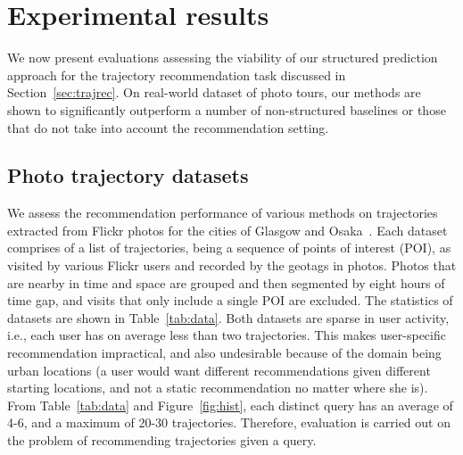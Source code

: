 
\secmoveup
\section{Experimental results}
\label{sec:experiment}
\textmoveup

We now present evaluations assessing the viability of our structured prediction approach
for the trajectory recommendation task discussed in Section~\ref{sec:trajrec}.
On real-world dataset of photo tours, our methods are shown to significantly outperform
a number of non-structured baselines or those that do not take into account the recommendation setting.


\secmoveup
\subsection{Photo trajectory datasets}
\label{sec:dataset}
\textmoveup

We assess the recommendation performance %
of various methods
on trajectories extracted from Flickr photos
for the cities of Glasgow and Osaka~\cite{thomee2016yfcc100m,ijcai15}.
Each dataset comprises of a
list of trajectories, being a sequence of points of interest (POI), as visited by various Flickr users
and recorded by the geotags in photos. Photos that are nearby in time and space are grouped and then segmented by eight hours of time gap, and visits that only include a single POI are excluded.
The statistics of datasets are shown in Table~\ref{tab:data}.
Both datasets are sparse in user activity,
i.e., each user has on average less than two trajectories.
This makes user-specific recommendation impractical, and also undesirable because of the domain being urban locations
(a user would want different recommendations given different starting locations, and not a static recommendation no matter where she is).
From Table~\ref{tab:data} and Figure~\ref{fig:hist},
each distinct query %
has an average of 4-6, and a maximum of 20-30 trajectories.
Therefore, evaluation is carried out on the problem of recommending trajectories given a query.

